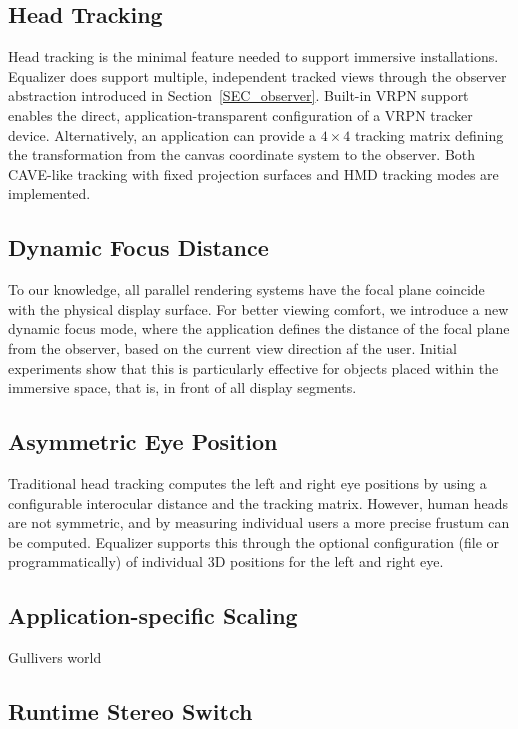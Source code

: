 \documentclass[journal]{vgtc}                %
\newcommand{\sref}[1]{Section~\ref{#1}}
\begin{document}
\subsection{Head Tracking}

Head tracking is the minimal feature needed to support immersive
installations. Equalizer does support multiple, independent tracked views
through the observer abstraction introduced in \sref{SEC_observer}. Built-in
VRPN support enables the direct, application-transparent configuration of a VRPN
tracker device. Alternatively, an application can provide a $4\times 4$ tracking
matrix defining the transformation from the canvas coordinate system to the
observer. Both CAVE-like tracking with fixed projection surfaces and HMD
tracking modes are implemented.

\subsection{Dynamic Focus Distance}

To our knowledge, all parallel rendering systems have the focal plane coincide
with the physical display surface. For better viewing comfort, we introduce a
new dynamic focus mode, where the application defines the distance of the focal
plane from the observer, based on the current view direction af the
user. Initial experiments show that this is particularly effective for objects
placed within the immersive space, that is, in front of all display segments.

\subsection{Asymmetric Eye Position}

Traditional head tracking computes the left and right eye positions by using a
configurable interocular distance and the tracking matrix. However, human heads
are not symmetric, and by measuring individual users a more precise frustum can
be computed. Equalizer supports this through the optional configuration (file or
programmatically) of individual 3D positions for the left and right eye.

\subsection{Application-specific Scaling}

Gullivers world

\subsection{Runtime Stereo Switch}
\end{document}
